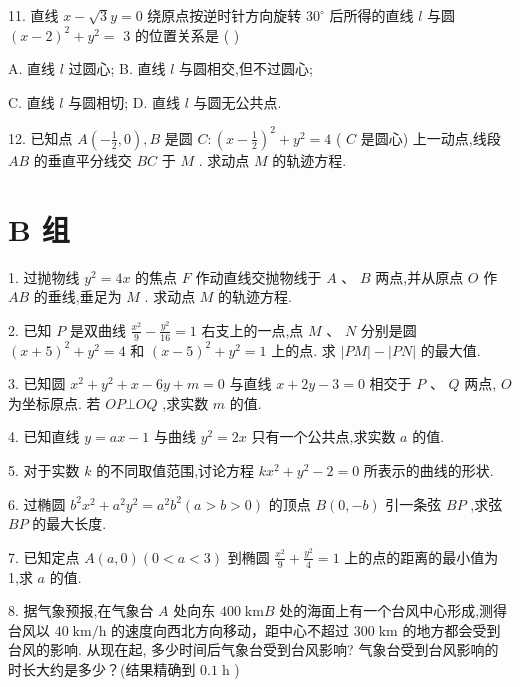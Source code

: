 \documentclass[10pt]{article}
\begin{document}
11. 直线 \(x - \sqrt{3}y = 0\) 绕原点按逆时针方向旋转 \({30}^{ \circ  }\) 后所得的直线 \(l\) 与圆 \({\left( x - 2\right) }^{2} + {y}^{2} =\) 3 的位置关系是 ( )

A. 直线 \(l\) 过圆心; B. 直线 \(l\) 与圆相交,但不过圆心;

C. 直线 \(l\) 与圆相切; D. 直线 \(l\) 与圆无公共点.

12. 已知点 \(A\left( {-\frac{1}{2},0}\right) ,B\) 是圆 \(C : {\left( x - \frac{1}{2}\right) }^{2} + {y}^{2} = 4\) ( \(C\) 是圆心) 上一动点,线段 \({AB}\) 的垂直平分线交 \({BC}\) 于 \(M\) . 求动点 \(M\) 的轨迹方程.

\section*{B 组}

1. 过抛物线 \({y}^{2} = {4x}\) 的焦点 \(F\) 作动直线交抛物线于 \(A\text{ 、 }B\) 两点,并从原点 \(O\) 作 \({AB}\) 的垂线,垂足为 \(M\) . 求动点 \(M\) 的轨迹方程.

2. 已知 \(P\) 是双曲线 \(\frac{{x}^{2}}{9} - \frac{{y}^{2}}{16} = 1\) 右支上的一点,点 \(M\text{ 、 }N\) 分别是圆 \({\left( x + 5\right) }^{2} + {y}^{2} = 4\) 和 \({\left( x - 5\right) }^{2} + {y}^{2} = 1\) 上的点. 求 \(\left| {PM}\right|  - \left| {PN}\right|\) 的最大值.

3. 已知圆 \({x}^{2} + {y}^{2} + x - {6y} + m = 0\) 与直线 \(x + {2y} - 3 = 0\) 相交于 \(P\text{ 、 }Q\) 两点, \(O\) 为坐标原点. 若 \({OP} \bot  {OQ}\) ,求实数 \(m\) 的值.

4. 已知直线 \(y = {ax} - 1\) 与曲线 \({y}^{2} = {2x}\) 只有一个公共点,求实数 \(a\) 的值.

5. 对于实数 \(k\) 的不同取值范围,讨论方程 \(k{x}^{2} + {y}^{2} - 2 = 0\) 所表示的曲线的形状.

6. 过椭圆 \({b}^{2}{x}^{2} + {a}^{2}{y}^{2} = {a}^{2}{b}^{2}\left( {a > b > 0}\right)\) 的顶点 \(B\left( {0, - b}\right)\) 引一条弦 \({BP}\) ,求弦 \({BP}\) 的最大长度.

7. 已知定点 \(A\left( {a,0}\right) \left( {0 < a < 3}\right)\) 到椭圆 \(\frac{{x}^{2}}{9} + \frac{{y}^{2}}{4} = 1\) 上的点的距离的最小值为 1,求 \(a\) 的值.

8. 据气象预报,在气象台 \(A\) 处向东 \({400}\mathrm{\;{km}}B\) 处的海面上有一个台风中心形成,测得台风以 \({40}\mathrm{\;{km}}/\mathrm{h}\) 的速度向西北方向移动，距中心不超过 \({300}\mathrm{\;{km}}\) 的地方都会受到台风的影响. 从现在起, 多少时间后气象台受到台风影响? 气象台受到台风影响的时长大约是多少？(结果精确到 \({0.1}\mathrm{\;h}\) )
\end{document}
